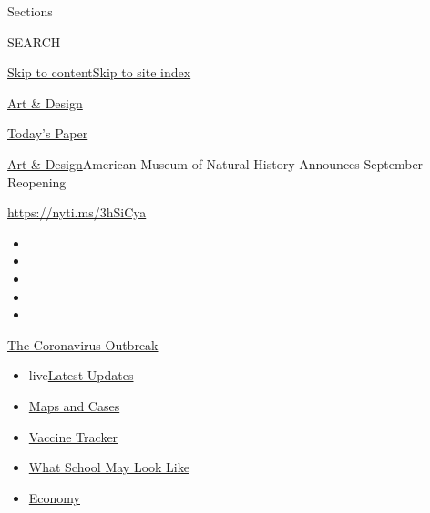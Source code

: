 Sections

SEARCH

\protect\hyperlink{site-content}{Skip to
content}\protect\hyperlink{site-index}{Skip to site index}

\href{https://www.nytimes.com/section/arts/design}{Art \& Design}

\href{https://myaccount.nytimes.com/auth/login?response_type=cookie\&client_id=vi}{}

\href{https://www.nytimes.com/section/todayspaper}{Today's Paper}

\href{/section/arts/design}{Art \& Design}\textbar{}American Museum of
Natural History Announces September Reopening

\url{https://nyti.ms/3hSiCya}

\begin{itemize}
\item
\item
\item
\item
\item
\end{itemize}

\href{https://www.nytimes.com/news-event/coronavirus?action=click\&pgtype=Article\&state=default\&region=TOP_BANNER\&context=storylines_menu}{The
Coronavirus Outbreak}

\begin{itemize}
\tightlist
\item
  live\href{https://www.nytimes.com/2020/08/01/world/coronavirus-covid-19.html?action=click\&pgtype=Article\&state=default\&region=TOP_BANNER\&context=storylines_menu}{Latest
  Updates}
\item
  \href{https://www.nytimes.com/interactive/2020/us/coronavirus-us-cases.html?action=click\&pgtype=Article\&state=default\&region=TOP_BANNER\&context=storylines_menu}{Maps
  and Cases}
\item
  \href{https://www.nytimes.com/interactive/2020/science/coronavirus-vaccine-tracker.html?action=click\&pgtype=Article\&state=default\&region=TOP_BANNER\&context=storylines_menu}{Vaccine
  Tracker}
\item
  \href{https://www.nytimes.com/interactive/2020/07/29/us/schools-reopening-coronavirus.html?action=click\&pgtype=Article\&state=default\&region=TOP_BANNER\&context=storylines_menu}{What
  School May Look Like}
\item
  \href{https://www.nytimes.com/live/2020/07/31/business/stock-market-today-coronavirus?action=click\&pgtype=Article\&state=default\&region=TOP_BANNER\&context=storylines_menu}{Economy}
\end{itemize}

